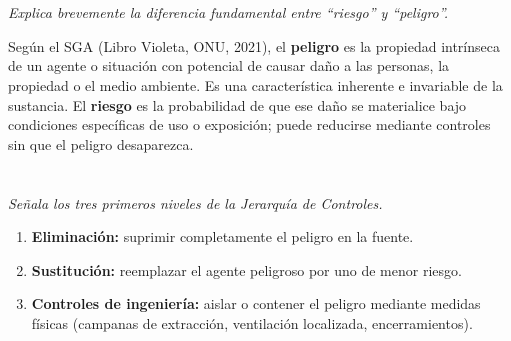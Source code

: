 
{}
\section*{\centering\fontsize{12}{18}}

\textit{Explica brevemente la diferencia fundamental entre ``riesgo'' y ``peligro''.}

\vspace{0.3cm}
Según el SGA (Libro Violeta, ONU, 2021), el \textbf{peligro} es la propiedad intrínseca de un agente o situación con potencial de causar daño a las personas, la propiedad o el medio ambiente. Es una característica inherente e invariable de la sustancia. El \textbf{riesgo} es la probabilidad de que ese daño se materialice bajo condiciones específicas de uso o exposición; puede reducirse mediante controles sin que el peligro desaparezca.


{}
\section*{\centering\fontsize{12}{18}}

\textit{Señala los tres primeros niveles de la Jerarquía de Controles.}

\vspace{0.3cm}
\begin{enumerate}
    \item \textbf{Eliminación:} suprimir completamente el peligro en la fuente.
    \item \textbf{Sustitución:} reemplazar el agente peligroso por uno de menor riesgo.
    \item \textbf{Controles de ingeniería:} aislar o contener el peligro mediante medidas físicas (campanas de extracción, ventilación localizada, encerramientos).
\end{enumerate}


